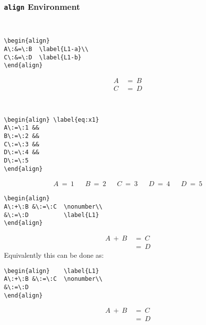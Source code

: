 \subsubsection{\texttt{\Large align} Environment}
%
\raggedright{}\\
\begin{verbatim}
\begin{align} 
A\:&=\:B  \label{L1-a}\\
C\:&=\:D  \label{L1-b}
\end{align} 
\end{verbatim}
%
%
\begin{align} 
A\:&=\:B  \label{L1-a}\\
C\:&=\:D  \label{L1-b}
\end{align}
%
%
\raggedright{}\\
%
\begin{verbatim}
\begin{align} \label{eq:x1}
A\:=\:1 && 
B\:=\:2 && 
C\:=\:3 && 
D\:=\:4 &&
D\:=\:5
\end{align}
\end{verbatim}
%
\begin{align} \label{eq:x1}
A\:=\:1 && 
B\:=\:2 && 
C\:=\:3 && 
D\:=\:4 &&
D\:=\:5
\end{align}
%
\begin{verbatim}
\begin{align}    
A\:+\:B &\:=\:C  \nonumber\\ 
&\:=\:D          \label{L1}
\end{align}
\end{verbatim}
%
%
\begin{align}   
A\:+\:B &\:=\:C  \nonumber\\ 
&\:=\:D          \label{L1}
\end{align}
%
%
Equivalently this can be done as:
%
\begin{verbatim}
\begin{align}    \label{L1} 
A\:+\:B &\:=\:C  \nonumber\\ 
&\:=\:D          
\end{align}
\end{verbatim}
%
%
\begin{align}    \label{L1} 
A\:+\:B &\:=\:C  \nonumber\\ 
&\:=\:D          
\end{align}
%
%

